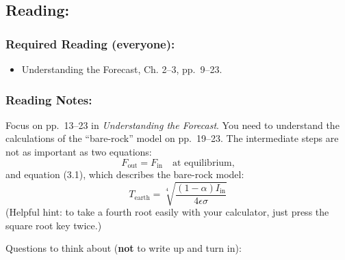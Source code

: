 \documentclass[
]{article}
\providecommand{\tightlist}{%
  \setlength{\itemsep}{0pt}\setlength{\parskip}{0pt}}
\begin{document}
\hypertarget{reading-2}{%
\subsection{Reading:}\label{reading-2}}

\hypertarget{required-reading-everyone-1}{%
\subsubsection{Required Reading
(everyone):}\label{required-reading-everyone-1}}

\begin{itemize}
\tightlist
\item
  Understanding the Forecast, Ch. 2--3, pp.~9--23.
\end{itemize}

\hypertarget{reading-notes-1}{%
\subsubsection{Reading Notes:}\label{reading-notes-1}}

Focus on pp.~13--23 in \emph{Understanding the Forecast}. You need to
understand the calculations of the ``bare-rock'' model on pp.~19--23.
The intermediate steps are not as important as two equations: \[
  F_{\text{out}} = F_{\text{in}}\quad\text{at equilibrium,}
\] and equation (3.1), which describes the bare-rock model: \[
  T_{\text{earth}} =
  \sqrt[4]{\frac{(1-\alpha)I_{\text{in}}}{4\epsilon\sigma}}
\] (Helpful hint: to take a fourth root easily with your calculator,
just press the square root key twice.)

Questions to think about (\textbf{not} to write up and turn in):
\end{document}
